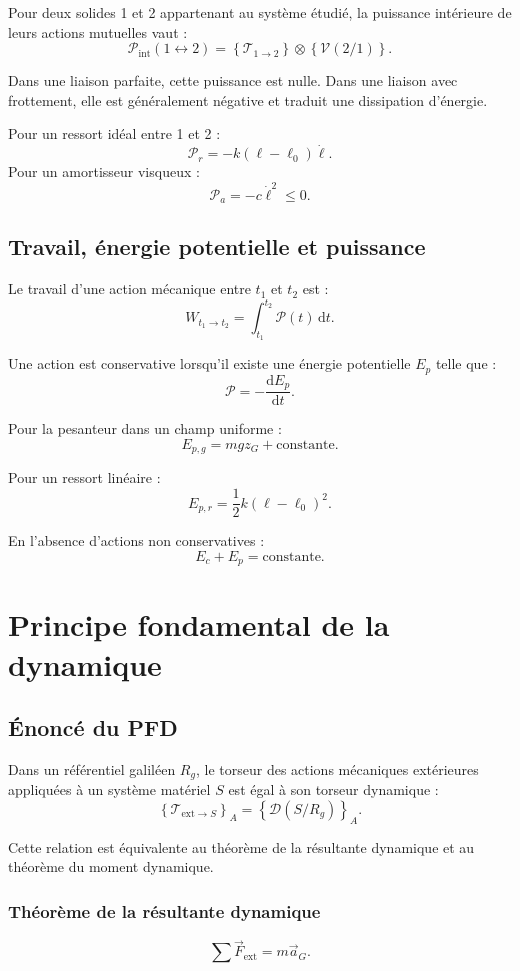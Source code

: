Pour deux solides 1 et 2 appartenant au système étudié, la puissance intérieure de leurs actions mutuelles vaut :
\[
\mathcal P_{\mathrm{int}}(1\leftrightarrow2)
=\left\{\mathcal T_{1\rightarrow2}\right\}
\otimes\left\{\mathcal V(2/1)\right\}.
\]

Dans une liaison parfaite, cette puissance est nulle. Dans une liaison avec frottement, elle est généralement négative et traduit une dissipation d'énergie.

Pour un ressort idéal entre 1 et 2 :
\[
\mathcal P_r=-k(\ell-\ell_0)\dot\ell.
\]
Pour un amortisseur visqueux :
\[
\mathcal P_a=-c\dot\ell^2\leq0.
\]

\subsection{Travail, énergie potentielle et puissance}

Le travail d'une action mécanique entre $t_1$ et $t_2$ est :
\[
W_{t_1\rightarrow t_2}=\int_{t_1}^{t_2}\mathcal P(t)\,\mathrm dt.
\]

Une action est conservative lorsqu'il existe une énergie potentielle $E_p$ telle que :
\[
\mathcal P=-\frac{\mathrm d E_p}{\mathrm dt}.
\]

Pour la pesanteur dans un champ uniforme :
\[
E_{p,g}=mgz_G+\text{constante}.
\]

Pour un ressort linéaire :
\[
E_{p,r}=\frac12 k(\ell-\ell_0)^2.
\]

En l'absence d'actions non conservatives :
\[
E_c+E_p=\text{constante}.
\]

\section{Principe fondamental de la dynamique}
\label{sec:am-11}

\subsection{Énoncé du PFD}

Dans un référentiel galiléen $R_g$, le torseur des actions mécaniques extérieures appliquées à un système matériel $S$ est égal à son torseur dynamique :
\[
\left\{\mathcal T_{\mathrm{ext}\rightarrow S}\right\}_A
=\left\{\mathcal D(S/R_g)\right\}_A.
\]

Cette relation est équivalente au théorème de la résultante dynamique et au théorème du moment dynamique.

\subsubsection{Théorème de la résultante dynamique}
\[
\sum\vec F_{\mathrm{ext}}=m\vec a_G.
\]

